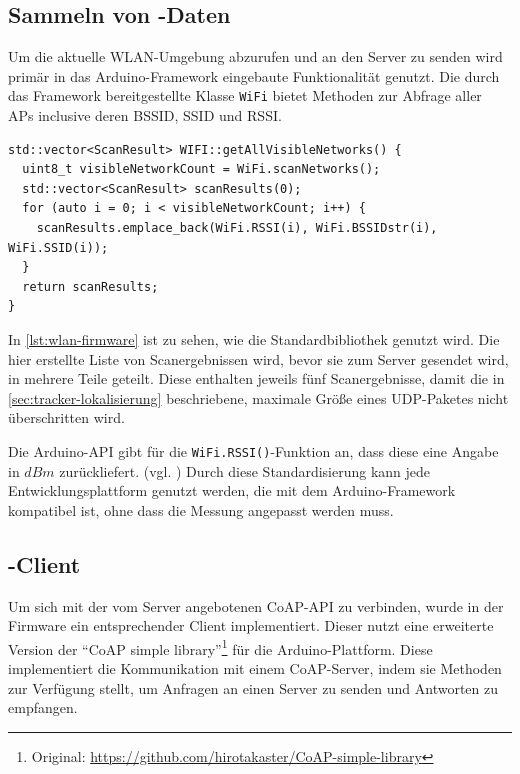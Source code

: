 \subsection{Sammeln von -Daten}

Um die aktuelle \gls{WLAN}-Umgebung abzurufen und an den Server zu senden wird primär in das
Arduino-Framework eingebaute Funktionalität genutzt. Die durch das Framework bereitgestellte Klasse
\texttt{WiFi} bietet Methoden zur Abfrage aller \glspl{AP} inclusive deren \gls{BSSID},
\gls{SSID} und \gls{RSSI}.

\begin{lstlisting}[caption={Ausschnit aus der Firmware des Trackers -- Abrufen der \glsentryshort{WLAN}-Netzwerke},label={lst:wlan-firmware}]
std::vector<ScanResult> WIFI::getAllVisibleNetworks() {
  uint8_t visibleNetworkCount = WiFi.scanNetworks();
  std::vector<ScanResult> scanResults(0);
  for (auto i = 0; i < visibleNetworkCount; i++) {
    scanResults.emplace_back(WiFi.RSSI(i), WiFi.BSSIDstr(i), WiFi.SSID(i));
  }
  return scanResults;
}
\end{lstlisting}

In \autoref{lst:wlan-firmware} ist zu sehen, wie die Standardbibliothek genutzt wird. Die hier
erstellte Liste von Scanergebnissen wird, bevor sie zum Server gesendet wird, in mehrere Teile
geteilt. Diese enthalten jeweils fünf Scanergebnisse, damit die in
\autoref{sec:tracker-lokalisierung} beschriebene, maximale Größe eines \gls{UDP}-Paketes nicht
überschritten wird.

Die Arduino-\gls{API} gibt für die \texttt{WiFi.RSSI()}-Funktion an, dass diese eine Angabe in $dBm$
zurückliefert. (vgl. \cite{Arduino2020.1}) Durch diese Standardisierung kann jede
Entwicklungsplattform genutzt werden, die mit dem Arduino-Framework kompatibel ist, ohne dass die
Messung angepasst werden muss.

\subsection{-Client}

Um sich mit der vom Server angebotenen \gls{CoAP}-\gls{API} zu verbinden, wurde in der Firmware ein
entsprechender Client implementiert. Dieser nutzt eine erweiterte Version der \enquote{CoAP simple
library}\footnote{Original: \url{https://github.com/hirotakaster/CoAP-simple-library}} für die
Arduino-Plattform. Diese implementiert die Kommunikation mit einem \gls{CoAP}-Server, indem sie
Methoden zur Verfügung stellt, um Anfragen an einen Server zu senden und Antworten zu empfangen.


